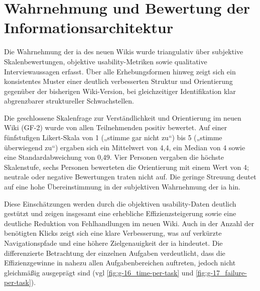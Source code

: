 \section{Wahrnehmung und Bewertung der Informationsarchitektur}
\label{sec:05-02_ia-challenges}

Die Wahrnehmung der \Gls{ia} des neuen Wikis wurde triangulativ über subjektive Skalenbewertungen, objektive \Gls{usability}-Metriken sowie qualitative Interviewaussagen erfasst. Über alle Erhebungsformen hinweg zeigt sich ein konsistentes Muster einer deutlich verbesserten Struktur und Orientierung gegenüber der bisherigen Wiki-Version, bei gleichzeitiger Identifikation klar abgrenzbarer struktureller Schwachstellen.

Die geschlossene Skalenfrage zur Verständlichkeit und Orientierung im neuen Wiki (GF-2) wurde von allen Teilnehmenden positiv bewertet. Auf einer fünfstufigen Likert-Skala von 1 („stimme gar nicht zu“) bis 5 („stimme überwiegend zu“) ergaben sich ein Mittelwert von 4{,}4, ein Median von 4 sowie eine Standardabweichung von 0{,}49. Vier Personen vergaben die höchste Skalenstufe, sechs Personen bewerteten die Orientierung mit einem Wert von 4; neutrale oder negative Bewertungen traten nicht auf. Die geringe Streuung deutet auf eine hohe Übereinstimmung in der subjektiven Wahrnehmung der \Gls{ia} hin.


Diese Einschätzungen werden durch die objektiven \Gls{usability}-Daten deutlich gestützt und zeigen insgesamt eine erhebliche Effizienzsteigerung sowie eine deutliche Reduktion von Fehlhandlungen im neuen Wiki. Auch in der Anzahl der benötigten Klicks zeigt sich eine klare Verbesserung, was auf verkürzte Navigationspfade und eine höhere Zielgenauigkeit der \Gls{ia} hindeutet. Die differenzierte Betrachtung der einzelnen Aufgaben verdeutlicht, dass die Effizienzgewinne in nahezu allen Aufgabenbereichen auftreten, jedoch nicht gleichmäßig ausgeprägt sind (\acrshort{vgl} \autoref{fig:g-16_time-per-task} und \autoref{fig:g-17_failure-per-task}).

\begin{figure}[H]
    \centering

    \begin{minipage}{0.48\textwidth}
        \centering
    \end{minipage}
    \hfill
    \begin{minipage}{0.48\textwidth}
        \centering
    \end{minipage}

\end{figure}


